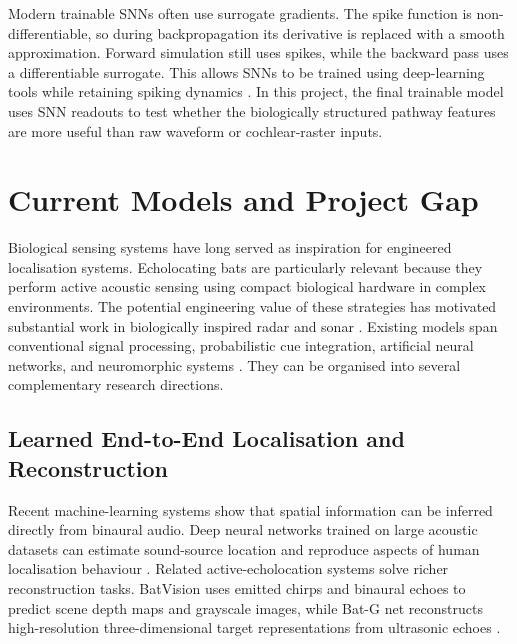 Modern trainable SNNs often use surrogate gradients. The spike function is non-differentiable, so during backpropagation its derivative is replaced with a smooth approximation. Forward simulation still uses spikes, while the backward pass uses a differentiable surrogate. This allows SNNs to be trained using deep-learning tools while retaining spiking dynamics \cite{Eshraghian2023TRAININGLEARNING}. In this project, the final trainable model uses SNN readouts to test whether the biologically structured pathway features are more useful than raw waveform or cochlear-raster inputs.


\section{Current Models and Project Gap}

Biological sensing systems have long served as inspiration for engineered localisation systems. Echolocating bats are particularly relevant because they perform active acoustic sensing using compact biological hardware in complex environments. The potential engineering value of these strategies has motivated substantial work in biologically inspired radar and sonar \cite{Balleri2017Biologically-inspiredNature}. Existing models span conventional signal processing, probabilistic cue integration, artificial neural networks, and neuromorphic systems \cite{Li2003ALocalization,Willert2006ALocalization,Carlini2024AuditoryReview}. They can be organised into several complementary research directions.

\subsection{Learned End-to-End Localisation and Reconstruction}

Recent machine-learning systems show that spatial information can be inferred directly from binaural audio. Deep neural networks trained on large acoustic datasets can estimate sound-source location and reproduce aspects of human localisation behaviour \cite{Francl2022DeepEnvironments,Baby2021AApplications}. Related active-echolocation systems solve richer reconstruction tasks. BatVision uses emitted chirps and binaural echoes to predict scene depth maps and grayscale images, while Bat-G net reconstructs high-resolution three-dimensional target representations from ultrasonic echoes \cite{ChristensenBatVision,HwangBat-GEchoes}.

